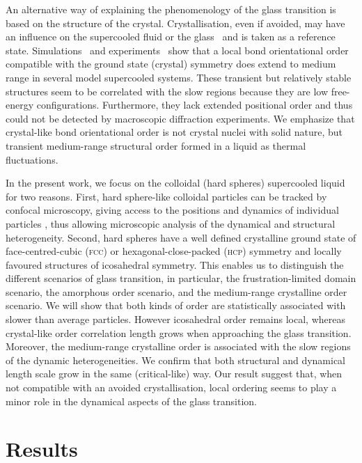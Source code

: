 An alternative way of explaining the phenomenology of the glass transition is based on the structure of the crystal. Crystallisation, even if avoided, may have an influence on the supercooled fluid or the glass~\citep{TanakaGJPCM, Cavagna2003, VanMegen2009a} and is taken as a reference state. Simulations~\cite{tanaka2010critical, Pedersen2010, Coslovich2011} and experiments~\citep{tanaka2010critical} show that a local bond orientational order compatible with the ground state (crystal) symmetry does extend to medium range in several model supercooled systems. These transient but relatively stable structures seem to be correlated with the slow regions because they are low free-energy configurations. Furthermore, they lack extended positional order and thus could not be detected by macroscopic diffraction experiments. We emphasize that crystal-like bond orientational order is not crystal nuclei with solid nature, but transient medium-range structural order formed in a liquid as thermal fluctuations. 

In the present work, we focus on the colloidal (hard spheres) supercooled liquid \cite{pusey1987ogt} for two reasons. First, hard sphere-like colloidal particles can be tracked by confocal microscopy, giving access to the positions and dynamics of individual particles \cite{kegel2000swe, weeks2000}, thus allowing microscopic analysis of the dynamical and structural heterogeneity. Second, hard spheres have a well defined crystalline ground state of face-centred-cubic (\textsc{fcc}) or hexagonal-close-packed (\textsc{hcp}) symmetry and locally favoured structures of icosahedral symmetry. This enables us to distinguish the different scenarios of glass transition, in particular, the frustration-limited domain scenario, the amorphous order scenario, and the medium-range crystalline order scenario. We will show that both kinds of order are statistically associated with slower than average particles. However icosahedral order remains local, whereas crystal-like order correlation length grows when approaching the glass transition. Moreover, the medium-range crystalline order is associated with the slow regions of the dynamic heterogeneities. We confirm that both structural and dynamical length scale grow in the same (critical-like) way. Our result suggest that, when not compatible with an avoided crystallisation, local ordering seems to play a minor role in the dynamical aspects of the glass transition.


\section*{Results}

